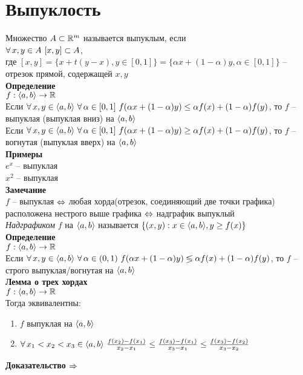 \documentclass[12pt]{article}
\begin{document}
\section{Выпуклость}
Множество $A \subset \mathbb{R}^m$ называется выпуклым, если\\
$\forall\, x,y \in A\ [x,y] \subset A$,\\
где $[x,y] = \{ x + t(y-x), y \in [0,1]\} = \{ \alpha x + (1-\alpha)y, \alpha \in [0,1] \}$ -- отрезок прямой, содержащей $x,y$\\
\textbf{Определение}\\
$f: \langle a, b \rangle \rightarrow \mathbb{R}$\\
Если $\forall\, x,y \in \langle a, b \rangle\ \forall\, \alpha \in [0,1]\ f(\alpha x + (1-\alpha) y) \leq \alpha f(x) + (1-\alpha) f(y)$, то $f$ -- выпуклая (выпуклая вниз) на $\langle a, b \rangle$\\
Если $\forall\, x,y \in \langle a, b \rangle\ \forall\, \alpha \in [0,1]\ f(\alpha x + (1-\alpha) y) \geq \alpha f(x) + (1-\alpha) f(y)$, то $f$ -- вогнутая (выпуклая вверх) на $\langle a, b \rangle$\\
\textbf{Примеры}\\
$e^x$ -- выпуклая\\
$x^2$ -- выпуклая\\
\textbf{Замечание}\\
$f$ -- выпуклая $\Leftrightarrow$ любая хорда(отрезок, соединяющий две точки графика) расположена нестрого выше графика $\Leftrightarrow$ надграфик выпуклый\\
\textit{Надграфиком} $f$ на $\langle a, b \rangle$ называется $\{ (x,y): x \in \langle a, b\rangle, y \geq f(x)\}$\\
\textbf{Определение}\\
$f: \langle a, b \rangle \rightarrow \mathbb{R}$\\
Если $\forall\, x,y \in \langle a, b \rangle\ \forall\, \alpha \in (0,1)\ f(\alpha x + (1-\alpha) y) \lessgtr \alpha f(x) + (1-\alpha) f(y)$, то $f$ -- строго выпуклая/вогнутая на $\langle a, b \rangle$\\
\textbf{Лемма о трех хордах}\\
$f: \langle a, b \rangle \rightarrow \mathbb{R}$\\
Тогда эквивалентны:
\begin{enumerate}
    \item $f$ выпуклая на $\langle a, b \rangle$
    \item $\forall\, x_1 < x_2 < x_3 \in \langle a, b \rangle\ \frac{f(x_2)-f(x_1)}{x_2-x_1} \leq \frac{f(x_3)-f(x_1)}{x_3-x_1} \leq \frac{f(x_3)-f(x_2)}{x_3-x_2}$
\end{enumerate}
\textbf{Доказательство $\Rightarrow$}\\
\end{document}
